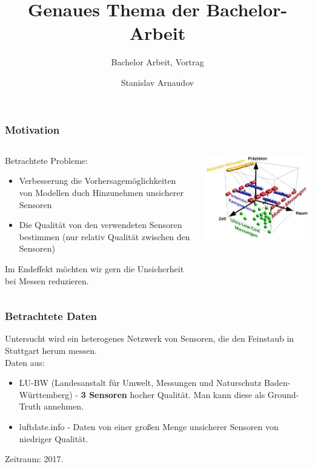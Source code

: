 \documentclass[18pt]{beamer}
\title[Short title]{Genaues Thema der Bachelor-Arbeit}
\subtitle{Bachelor Arbeit, Vortrag}
\author{Stanislav Arnaudov}
\institute{TECO - Das Telecooperation Office}
\begin{document}
 




\begin{frame}
 \titlepage
\end{frame}

\begin{frame}
  \frametitle{Motivation}
  
  \begin{columns}
    \begin{column}{0.4\textwidth}
      Betrachtete Probleme:
      \begin{itemize}
      \item Verbesserung die Vorhersagemöglichkeiten von Modellen duch Hinzunehmen unsicherer Sensoren
      \item Die Qualität von den verwendeten Sensoren bestimmen (nur relativ Qualität zwischen den Sensoren)
      \end{itemize}
      Im Endeffekt möchten wir gern die Unsicherheit bei Messen reduzieren.
    \end{column}
    \begin{column}{0.6\textwidth}
      \begin{center}
        \includegraphics[scale=0.5]{images/motivation}
      \end{center}
    \end{column}
  \end{columns}
  
\end{frame}

\begin{frame}
  \frametitle{Betrachtete Daten}
  Untersucht wird ein heterogenes Netzwerk von Sensoren, die den Feinstaub in Stuttgart herum messen.\\
  Daten aus:
  \begin{itemize}
  \item LU-BW (Landesanstalt für Umwelt, Messungen und Naturschutz Baden-Württemberg) - \textbf{3 Sensoren} hocher Qualität. Man kann diese als Ground-Truth annehmen.
  \item luftdate.info - Daten von einer großen Menge unsicherer Sensoren von niedriger Qualität.
  \end{itemize}
  Zeitraum: 2017.
  
\end{frame}
\end{document}
